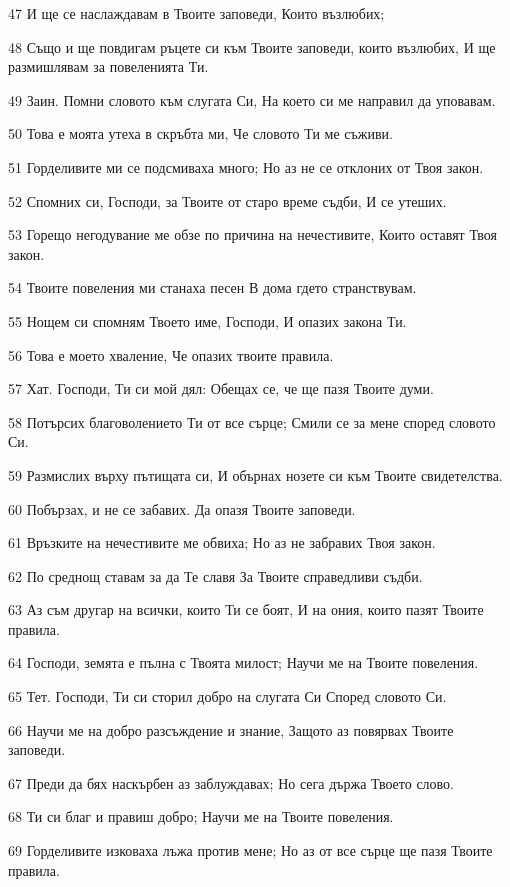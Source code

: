 \par 47 И ще се наслаждавам в Твоите заповеди, Които възлюбих;
\par 48 Също и ще повдигам ръцете си към Твоите заповеди, които възлюбих, И ще размишлявам за повеленията Ти.
\par 49 Заин. Помни словото към слугата Си, На което си ме направил да уповавам.
\par 50 Това е моята утеха в скръбта ми, Че словото Ти ме съживи.
\par 51 Горделивите ми се подсмиваха много; Но аз не се отклоних от Твоя закон.
\par 52 Спомних си, Господи, за Твоите от старо време съдби, И се утеших.
\par 53 Горещо негодувание ме обзе по причина на нечестивите, Които оставят Твоя закон.
\par 54 Твоите повеления ми станаха песен В дома гдето странствувам.
\par 55 Нощем си спомням Твоето име, Господи, И опазих закона Ти.
\par 56 Това е моето хваление, Че опазих твоите правила.
\par 57 Хат. Господи, Ти си мой дял: Обещах се, че ще пазя Твоите думи.
\par 58 Потърсих благоволението Ти от все сърце; Смили се за мене според словото Си.
\par 59 Размислих върху пътищата си, И обърнах нозете си към Твоите свидетелства.
\par 60 Побързах, и не се забавих. Да опазя Твоите заповеди.
\par 61 Връзките на нечестивите ме обвиха; Но аз не забравих Твоя закон.
\par 62 По среднощ ставам за да Те славя За Твоите справедливи съдби.
\par 63 Аз съм другар на всички, които Ти се боят, И на ония, които пазят Твоите правила.
\par 64 Господи, земята е пълна с Твоята милост; Научи ме на Твоите повеления.
\par 65 Тет. Господи, Ти си сторил добро на слугата Си Според словото Си.
\par 66 Научи ме на добро разсъждение и знание, Защото аз повярвах Твоите заповеди.
\par 67 Преди да бях наскърбен аз заблуждавах; Но сега държа Твоето слово.
\par 68 Ти си благ и правиш добро; Научи ме на Твоите повеления.
\par 69 Горделивите изковаха лъжа против мене; Но аз от все сърце ще пазя Твоите правила.
